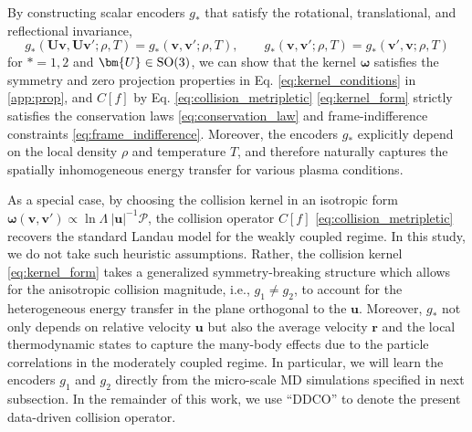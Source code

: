 \documentclass[preprint,1p,times]{elsarticle}
\theoremstyle{definition}
\theoremstyle{remark}
\begin{document}
By constructing scalar encoders $g_{\ast}$ that satisfy the rotational, translational, and reflectional invariance,
\begin{equation}
    g_{\ast}(\bm{U}\bm{v}, \bm{U}\bm{v}'; \rho, T) = g_{\ast}(\bm{v}, \bm{v}'; \rho, T), \qquad 
    g_{\ast}(\bm{v}, \bm{v}'; \rho, T) = g_{\ast}(\bm{v}', \bm{v}; \rho, T)
\label{eq:encoder_g}
\end{equation}
for $\ast = 1, 2$ and $\bm{U} \in \rm{SO}(3)$, we can show that the kernel $\bm{\omega}$ satisfies the symmetry and zero projection properties in Eq. \eqref{eq:kernel_conditions} in \ref{app:prop}, and $C[f]$ by Eq. \eqref{eq:collision_metripletic} \eqref{eq:kernel_form} strictly satisfies the conservation laws \eqref{eq:conservation_law} and frame-indifference constraints \eqref{eq:frame_indifference}. Moreover, the encoders $g_{\ast}$ explicitly depend on the local density $\rho$ and temperature $T$, and therefore naturally captures the spatially inhomogeneous energy transfer for various plasma conditions. 

As a special case, by choosing the collision kernel in an isotropic form $\bm{\omega}(\bm{v},\bm{v}') \propto \ln \Lambda ~ |\bm{u}|^{-1}\bm{\mathcal{P}}$, the collision operator $C[f]$ \eqref{eq:collision_metripletic} recovers the standard Landau model for the weakly coupled regime. In this study, we do not take such heuristic assumptions. Rather, the collision kernel \eqref{eq:kernel_form} takes a generalized symmetry-breaking structure which allows for the anisotropic collision magnitude, i.e., $g_1 \neq g_2$, to account for the heterogeneous energy transfer in the plane orthogonal to the $\bm u$. Moreover, $g_\ast$ not only depends on relative velocity $\bm u$ but also the average velocity $\bm r$ and the local thermodynamic states to capture the many-body effects due to the particle correlations in the moderately coupled regime. In particular, we will learn the encoders $g_1$ and $g_2$ directly from the micro-scale MD simulations specified in next subsection. In the remainder of this work, we use ``DDCO'' to denote the present data-driven collision operator. 








\end{document}
